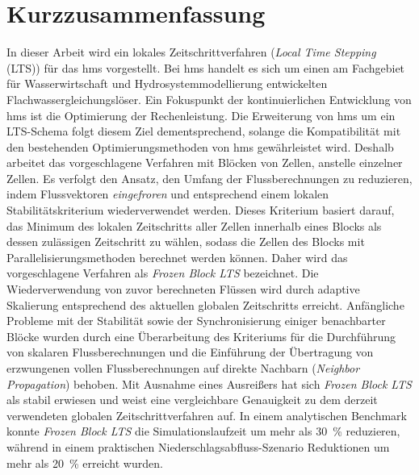 
\section*{Kurzzusammenfassung}\label{sec:kurzzus}

In dieser Arbeit wird ein lokales Zeitschrittverfahren (\emph{Local Time Stepping} (LTS)) für das \gls{hms} vorgestellt.
Bei \gls{hms} handelt es sich um einen am Fachgebiet für Wasserwirtschaft und Hydrosystemmodellierung entwickelten Flachwassergleichungslöser.
Ein Fokuspunkt der kontinuierlichen Entwicklung von \gls{hms} ist die Optimierung der Rechenleistung.
Die Erweiterung von \gls{hms} um ein LTS-Schema folgt diesem Ziel dementsprechend, solange die Kompatibilität mit den bestehenden Optimierungsmethoden von \gls{hms} gewährleistet wird.
Deshalb arbeitet das vorgeschlagene Verfahren mit Blöcken von Zellen, anstelle einzelner Zellen.
Es verfolgt den Ansatz, den Umfang der Flussberechnungen zu reduzieren, indem Flussvektoren \emph{eingefroren} und entsprechend einem lokalen Stabilitätskriterium wiederverwendet werden.
Dieses Kriterium basiert darauf, das Minimum des lokalen Zeitschritts aller Zellen innerhalb eines Blocks als dessen zulässigen Zeitschritt zu wählen, sodass die Zellen des Blocks mit Parallelisierungsmethoden berechnet werden können.
Daher wird das vorgeschlagene Verfahren als \emph{Frozen Block LTS} bezeichnet.
Die Wiederverwendung von zuvor berechneten Flüssen wird durch adaptive Skalierung entsprechend des aktuellen globalen Zeitschritts erreicht.
Anfängliche Probleme mit der Stabilität sowie der Synchronisierung einiger benachbarter Blöcke wurden durch eine Überarbeitung des Kriteriums für die Durchführung von skalaren Flussberechnungen und die Einführung der Übertragung von erzwungenen vollen Flussberechnungen auf direkte Nachbarn (\emph{Neighbor Propagation}) behoben.
Mit Ausnahme eines Ausreißers hat sich \emph{Frozen Block LTS} als stabil erwiesen und weist eine vergleichbare Genauigkeit zu dem derzeit verwendeten globalen Zeitschrittverfahren auf.
In einem analytischen Benchmark konnte \emph{Frozen Block LTS} die Simulationslaufzeit um
mehr als \SI{30}{\percent} reduzieren, während in einem praktischen Niederschlagsabfluss-Szenario Reduktionen um mehr als \SI{20}{\percent} erreicht wurden.


